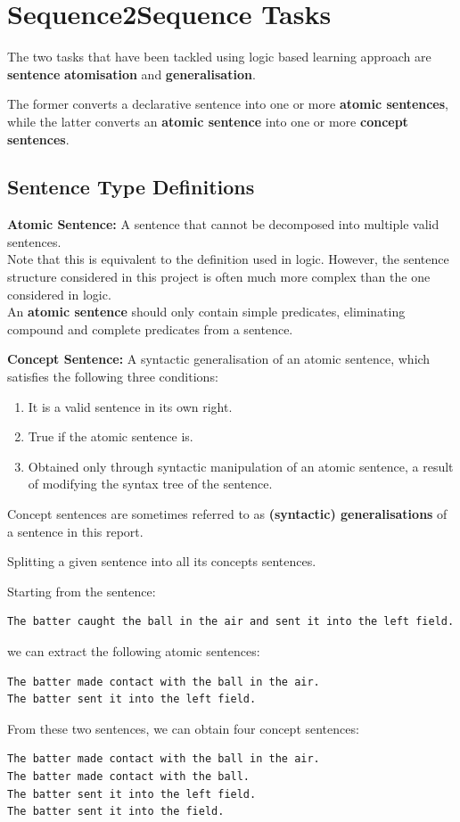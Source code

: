 \section{Sequence2Sequence Tasks}

The two tasks that have been tackled using logic based learning approach are \textbf{sentence} \textbf{atomisation} and \textbf{generalisation}.

The former converts a declarative sentence into one or more \textbf{atomic sentences}, while the latter converts an \textbf{atomic sentence} into one or more \textbf{concept sentences}.

\subsection{Sentence Type Definitions}

\textbf{Atomic Sentence:} A sentence that cannot be decomposed into multiple valid sentences. \\
Note that this is equivalent to the definition used in logic.
However, the sentence structure considered in this project is often much more complex than the one considered in logic.\\
An \textbf{atomic sentence} should only contain simple predicates, eliminating compound and complete predicates from a sentence.


\textbf{Concept Sentence:} A syntactic generalisation of an atomic sentence, which satisfies the following three conditions:
\begin{enumerate}
    \item It is a valid sentence in its own right.
    \item True if the atomic sentence is.
    \item Obtained only through syntactic manipulation of an atomic sentence, a result of modifying the syntax tree of the sentence.
\end{enumerate}

Concept sentences are sometimes referred to as \textbf{(syntactic) generalisations} of a sentence in this report.


\begin{example}
Splitting a given sentence into all its concepts sentences.

Starting from the sentence:  
\begin{verbatim}
The batter caught the ball in the air and sent it into the left field.
\end{verbatim}
we can extract the following atomic sentences: 
\begin{verbatim}
The batter made contact with the ball in the air. 
The batter sent it into the left field.
\end{verbatim}
From these two sentences, we can obtain four concept sentences: 
\begin{verbatim}
The batter made contact with the ball in the air.
The batter made contact with the ball.
The batter sent it into the left field.
The batter sent it into the field.
\end{verbatim}

\end{example}


